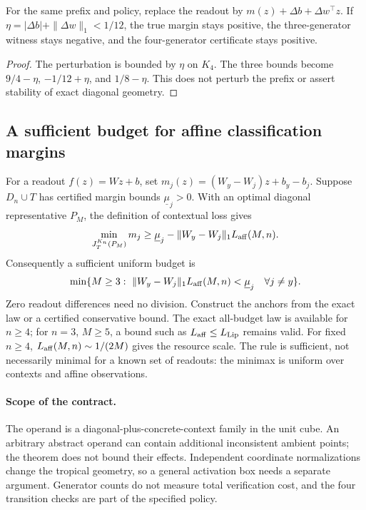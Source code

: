 \begin{corollary}\label{cor:readout-stability}
For the same prefix and policy, replace the readout by $m(z)+\Delta b+\Delta w^\top z$. If $\eta=|\Delta b|+\|\Delta w\|_1<1/12$, the true margin stays positive, the three-generator witness stays negative, and the four-generator certificate stays positive.
\end{corollary}
\begin{proof}
The perturbation is bounded by $\eta$ on $K_4$. The three bounds become $9/4-\eta$, $-1/12+\eta$, and $1/8-\eta$. This does not perturb the prefix or assert stability of exact diagonal geometry.
\end{proof}

\subsection{A sufficient budget for affine classification margins}
For a readout $f(z)=Wz+b$, set $m_j(z)=(W_y-W_j)z+b_y-b_j$. Suppose $D_n\cup T$ has certified margin bounds $\underline\mu_j>0$. With an optimal diagonal representative $P_M$, the definition of contextual loss gives
\begin{equation}\label{eq:margin-contract}
\min_{J_T^{K_n}(P_M)}m_j\ge\underline\mu_j-\|W_y-W_j\|_1L_{\mathrm{aff}}(M,n).
\end{equation}
Consequently a sufficient uniform budget is
\begin{equation}\label{eq:budget-policy}
\min\{M\ge3:\ \|W_y-W_j\|_1L_{\mathrm{aff}}(M,n)<\underline\mu_j\quad\forall j\ne y\}.
\end{equation}
Zero readout differences need no division. Construct the anchors from the exact law or a certified conservative bound. The exact all-budget law is available for $n\ge4$; for $n=3$, $M\ge5$, a bound such as $L_{\mathrm{aff}}\le L_{\mathrm{Lip}}$ remains valid. For fixed $n\ge4$, $L_{\mathrm{aff}}(M,n)\sim1/(2M)$ gives the resource scale. The rule is sufficient, not necessarily minimal for a known set of readouts: the minimax is uniform over contexts and affine observations.

\paragraph{Scope of the contract.}
The operand is a diagonal-plus-concrete-context family in the unit cube. An arbitrary abstract operand can contain additional inconsistent ambient points; the theorem does not bound their effects. Independent coordinate normalizations change the tropical geometry, so a general activation box needs a separate argument. Generator counts do not measure total verification cost, and the four transition checks are part of the specified policy.

